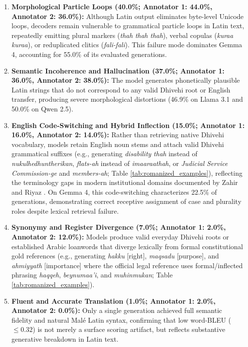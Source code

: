 \documentclass[acmsmall,review,anonymous]{acmart}
\begin{document}
\begin{enumerate}
    \item \textbf{Morphological Particle Loops (40.0\%; Annotator 1: 44.0\%, Annotator 2: 36.0\%):} Although Latin output eliminates byte-level Unicode loops, decoders remain vulnerable to grammatical particle loops in Latin text, repeatedly emitting plural markers (\textit{thah thah thah}), verbal copulas (\textit{kuraa kuraa}), or reduplicated clitics (\textit{fali-fali}). This failure mode dominates Gemma 4, accounting for 55.0\% of its evaluated generations.
    \item \textbf{Semantic Incoherence and Hallucination (37.0\%; Annotator 1: 36.0\%, Annotator 2: 38.0\%):} The model generates phonetically plausible Latin strings that do not correspond to any valid Dhivehi root or English transfer, producing severe morphological distortions (46.9\% on Llama 3.1 and 50.0\% on Qwen 2.5).
    \item \textbf{English Code-Switching and Hybrid Inflection (15.0\%; Annotator 1: 16.0\%, Annotator 2: 14.0\%):} Rather than retrieving native Dhivehi vocabulary, models retain English noun stems and attach valid Dhivehi grammatical suffixes (e.g., generating \textit{disability thah} instead of \textit{nukulhedhuntherikan}, \textit{flats-ah} instead of \textit{imaaraathah}, or \textit{Judicial Service Commission-ge} and \textit{members-ah}; Table \ref{tab:romanized_examples}), reflecting the terminology gaps in modern institutional domains documented by Zahir and Riyaz \cite{zahir_expanding_2024}. On Gemma 4, this code-switching characterizes 22.5\% of generations, demonstrating correct receptive assignment of case and plurality roles despite lexical retrieval failure.
    \item \textbf{Synonymy and Register Divergence (7.0\%; Annotator 1: 2.0\%, Annotator 2: 12.0\%):} Models produce valid everyday Dhivehi roots or established Arabic loanwords that diverge lexically from formal constitutional gold references (e.g., generating \textit{hakku} [right], \textit{maqsadu} [purpose], and \textit{ahmiyyath} [importance] where the official legal reference uses formal/inflected phrasing \textit{haqqeh}, \textit{beynumaa'i}, and \textit{muhinmukan}; Table \ref{tab:romanized_examples}).
    \item \textbf{Fluent and Accurate Translation (1.0\%; Annotator 1: 2.0\%, Annotator 2: 0.0\%):} Only a single generation achieved full semantic fidelity and natural Mal\'{e} Latin syntax, confirming that low word-BLEU ($\le 0.32$) is not merely a surface scoring artifact, but reflects substantive generative breakdown in Latin text.
\end{enumerate}
\end{document}
